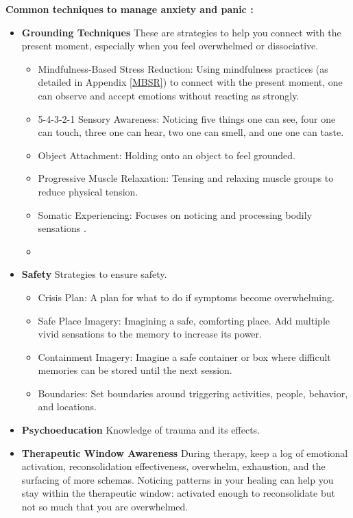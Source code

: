 \documentclass[12pt,letterpaper]{article}
\begin{document}
\noindent \textbf{Common techniques to manage anxiety and panic \cite{vanderKolkBody,williamsWorkbook}:}
\begin{itemize}
    \item \textbf{Grounding Techniques} These are strategies to help you connect with the present moment, especially when you feel overwhelmed or dissociative.
    \begin{itemize}
        \item Mindfulness-Based Stress Reduction: Using mindfulness practices (as detailed in Appendix \ref{MBSR}) to connect with the present moment, one can observe and accept emotions without reacting as strongly.
        \item 5-4-3-2-1 Sensory Awareness: Noticing five things one can see, four one can touch, three one can hear, two one can smell, and one one can taste.
        \item Object Attachment: Holding onto an object to feel grounded.
        \item Progressive Muscle Relaxation: Tensing and relaxing muscle groups to reduce physical tension.
        \item Somatic Experiencing: Focuses on noticing and processing bodily sensations \cite{levineSomatic}. 
        \item {}
    \end{itemize}
    \item \textbf{Safety} Strategies to ensure safety.
    \begin{itemize}
        \item Crisis Plan: A plan for what to do if symptoms become overwhelming.
        \item Safe Place Imagery: Imagining a safe, comforting place. Add multiple vivid sensations to the memory to increase its power.
        \item Containment Imagery: Imagine a safe container or box where difficult memories can be stored until the next session.
        \item Boundaries: Set boundaries around triggering activities, people, behavior, and locations.
    \end{itemize}
    \item \textbf{Psychoeducation} Knowledge of trauma and its effects.
    \item \textbf{Therapeutic Window Awareness} During therapy, keep a log of emotional activation, reconsolidation effectiveness, overwhelm, exhaustion, and the surfacing of more schemas. Noticing patterns in your healing can help you stay within the therapeutic window: activated enough to reconsolidate but not so much that you are overwhelmed. 

\end{itemize}
\end{document}
